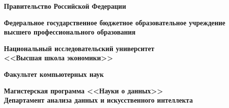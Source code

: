\documentclass[specialist,
substylefile = spbu.rtx,
               subf,href,colorlinks=true, 12pt]{disser}
\begin{document}
%
%

%
%
%
%
%
%

\thispagestyle{empty}
\begin{center}

	\textbf{Правительство Российской Федерации}

	\textbf{Федеральное государственное бюджетное образовательное учреждение \\
		высшего профессионального образования}
	\vspace{0.5ex}
	
	\textbf{ Национальный исследовательский университет}\\
	\textbf{<<Высшая школа экономики>>}
	\vspace{0.5ex}
\end{center}
\vspace{2ex}
\begin{center}
	\textbf{Факультет компьютерных наук}
\end{center}
\begin{flushleft}
\noindent
\textbf{Магистерская программа <<Науки о данных>>}\\
\textbf{Департамент анализа данных и искусственного интеллекта}
\end{flushleft}
\end{document}
